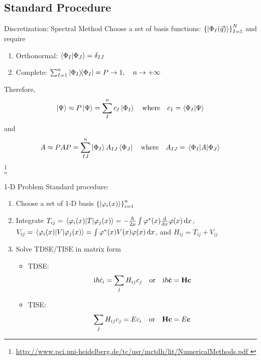 \documentclass[12pt]{beamer}
\let\temp\phi
\let\phi\varphi
\let\varphi\temp
\newcommand{\iu}{\mathrm{i}}
\newcommand\blfootnote[1]{%
    \begingroup
    \renewcommand\thefootnote{}\footnote{\tiny#1}%
    \addtocounter{footnote}{-1}%
    \endgroup
}
\begin{document}
    \subsection{Standard Procedure}
    \begin{frame}{Discretization: Spectral Method}
        Choose a set of basis functions:
            $\left\{ \ket{\Phi_I(\vec{q})} \right\}^N_{I=1}$
        and require
        \begin{enumerate}
            \item Orthonormal: $\braket{\Phi_I}{\Phi_J} = \delta_{IJ}$
            \item Complete: $\sum_{I=1}^n \ketbra{\Phi_I} = P \to 1 \qc n \to +\infty$
        \end{enumerate}
        Therefore,
        \begin{equation*}
            \ket{\Psi} \approx P\ket{\Psi} = \sum_I^n c_I \ket{\Phi_I} \qq{where} c_I = \braket{\Phi_I}{\Psi}
        \end{equation*}
        and
        \begin{equation*}
            A \approx PAP = \sum_{IJ}^n \ket{\Phi_I} A_{IJ} \bra{\Phi_J} \qq{where} A_{IJ} = \matrixel{\Phi_I}{A}{\Phi_J}
        \end{equation*}
        \blfootnote{
            \url{
                http://www.pci.uni-heidelberg.de/tc/usr/mctdh/lit/NumericalMethods.pdf
            }
        }
    \end{frame}

    \begin{frame}{1-D Problem}
        Standard procedure:
        \begin{enumerate}
            \item Choose a set of 1-D basis $\left\{ \ket{\phi_i(x)} \right\}^n_{i=1}$
            \item Integrate
            $T_{ij} = \mel{\phi_i(x)}{T}{\phi_j(x)} = -\frac{\hbar}{2\mu} \int \phi^*(x) \dv{x} \phi(x) \dd{x}$,
            $V_{ij} = \mel{\phi_i(x)}{V}{\phi_j(x)} = \int \phi^*(x) V(x) \phi(x) \dd{x}$, and
            $H_{ij} = T_{ij} + V_{ij}$
            \item Solve TDSE/TISE in matrix form
            \begin{itemize}
                \item TDSE:
                \[
                    \iu \hbar \dot c_i = \sum_j H_{ij} c_j \qor
                    \iu \hbar \dot{\vb{c}} = \vb{H} \vb{c} 
                \]
                \item TISE:
                \[
                    \sum_j H_{ij} c_j = E c_i \qor
                    \vb{H} \vb{c} = E \vb{c} 
                \]
            \end{itemize}
        \end{enumerate}
    \end{frame}
\end{document}
